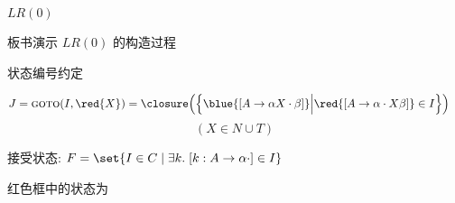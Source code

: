 \begin{frame}{}
  \begin{center}
    $LR(0)$ 

    \vspace{0.30cm}

    \vspace{0.30cm}
  \end{center}
\end{frame}

\begin{frame}{}
  \begin{center}
    板书演示 $LR(0)$ 的构造过程

    \vspace{0.20cm}
    状态编号约定
  \end{center}
\end{frame}

\begin{frame}{}
\end{frame}

\begin{frame}{}
  \begin{center}
    \begin{align*}
      J = \textsc{goto}(I, \red{X}) &= \closure\Big(\Big\{
            \blue{[A \to \alpha X \cdot \beta]}
          \Big\lvert \red{[A \to \alpha \cdot X \beta]} \in I \Big\}\Big)
    \end{align*}
    \[
      (X \in N \cup T)
    \]
  \end{center}
\end{frame}

\begin{frame}{}

  \pause
  \vspace{0.50cm}
  \begin{center}
    接受状态: $F = \set{I \in C \mid \exists k.\; [k: A \to \alpha \cdot] \in I}$
  \end{center}
\end{frame}

\begin{frame}{}
  \begin{center}

    红色框中的状态为 
  \end{center}
\end{frame}

